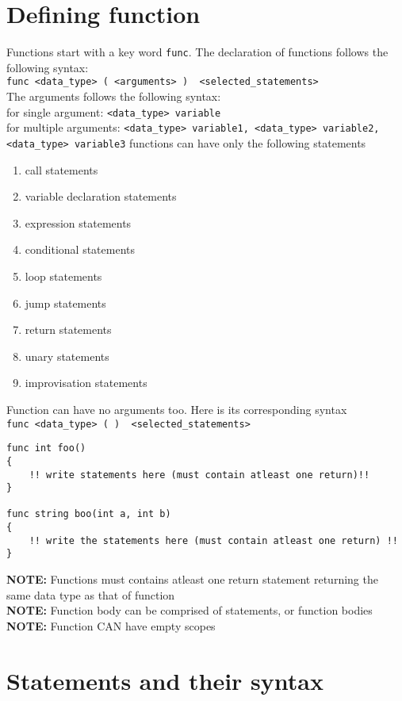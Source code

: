 \documentclass[journal, 18pt]{report}
\begin{document}
\chapter{Defining function}
Functions start with a key word \texttt{func}. The declaration of functions follows the following syntax:\\
\texttt{func <data\_type> (  <arguments> ) { <selected\_statements> }}\\
The arguments follows the following syntax:\\
for single argument: \texttt{<data\_type> variable} \\
for multiple arguments: \texttt{<data\_type> variable1, <data\_type> variable2, <data\_type> variable3}
functions can have only the following statements
\begin{enumerate}
    \item call statements
    \item variable declaration statements
    \item expression statements
    \item conditional statements
    \item loop statements
    \item jump statements
    \item return statements
    \item unary statements
    \item improvisation statements
\end{enumerate}
Function can have no arguments too. Here is its corresponding syntax\\
\texttt{func <data\_type> ( ) { <selected\_statements> }}
\begin{lstlisting}
func int foo()
{
    !! write statements here (must contain atleast one return)!!
}

func string boo(int a, int b)
{
    !! write the statements here (must contain atleast one return) !!
}
\end{lstlisting}

\textbf{NOTE:} Functions must contains atleast one return statement returning the same data type as that of function\\
\textbf{NOTE:} Function body can be comprised of statements, or function bodies\\
\textbf{NOTE:} Function CAN have empty scopes\\

\chapter{Statements and their syntax}
\end{document}
